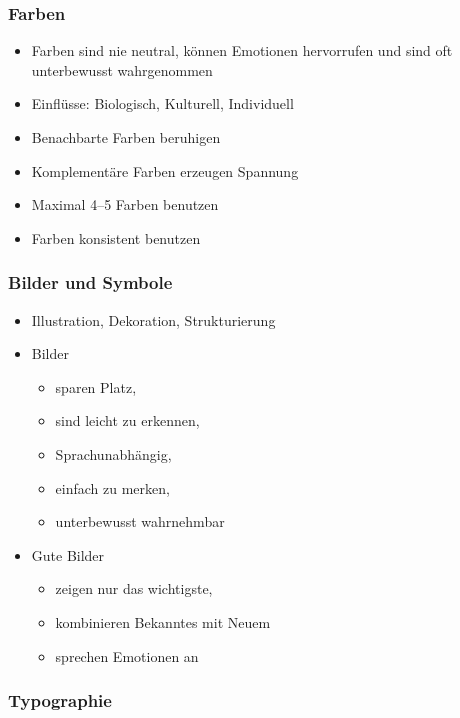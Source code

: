 \subsubsection{Farben}

\begin{itemize}
\item
  Farben sind nie neutral, können Emotionen hervorrufen und sind oft
  unterbewusst wahrgenommen
\item
  Einflüsse: Biologisch, Kulturell, Individuell
\item
  Benachbarte Farben beruhigen
\item
  Komplementäre Farben erzeugen Spannung
\item
  Maximal 4--5 Farben benutzen
\item
  Farben konsistent benutzen
\end{itemize}

\subsubsection{Bilder und Symbole}

\begin{itemize}
\item
  Illustration, Dekoration, Strukturierung
\item
  Bilder

  \begin{itemize}
  \item
    sparen Platz,
  \item
    sind leicht zu erkennen,
  \item
    Sprachunabhängig,
  \item
    einfach zu merken,
  \item
    unterbewusst wahrnehmbar
  \end{itemize}
\item
  Gute Bilder

  \begin{itemize}
  \item
    zeigen nur das wichtigste,
  \item
    kombinieren Bekanntes mit Neuem
  \item
    sprechen Emotionen an
  \end{itemize}
\end{itemize}

\subsubsection{Typographie}


